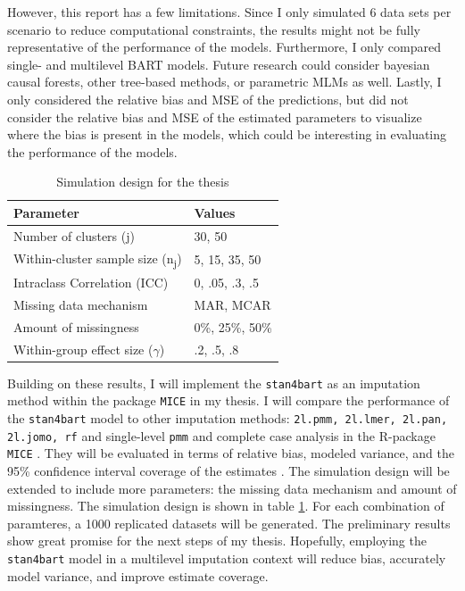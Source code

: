 \documentclass[10pt, a4paper, titlepage]{article}
\begin{document}
However, this report has a few limitations. Since I only simulated 6 data sets per scenario to reduce computational constraints, the results might not be fully representative of the performance of the models. Furthermore, I only compared single- and multilevel BART models. Future research could consider bayesian causal forests, other tree-based methods, or parametric MLMs as well. Lastly, I only considered the relative bias and MSE of the predictions, but did not consider the relative bias and MSE of the estimated parameters to visualize where the bias is present in the models, which could be interesting in evaluating the performance of the models.

\begin{table}
\centering
\caption{Simulation design for the thesis}
\label{tab:simulationparameters2}
\begin{tabular}{l|l}
\textbf{Parameter}                                  & \textbf{Values} \\ \hline
Number of clusters (j)                              & 30, 50          \\
Within-cluster sample size (n\textsubscript{j})     & 5, 15, 35, 50   \\
Intraclass Correlation (ICC)                        & 0, .05, .3, .5  \\
Missing data mechanism                              & MAR, MCAR       \\
Amount of missingness                               & 0\%, 25\%, 50\% \\
Within-group effect size ($\gamma$)                 & .2, .5, .8
\end{tabular}
\end{table}

Building on these results, I will implement the \texttt{stan4bart} as an imputation method within the package \texttt{MICE} \citep{buuren2011} in my thesis. I will compare the performance of the \texttt{stan4bart} model to other imputation methods: \texttt{2l.pmm, 2l.lmer, 2l.pan, 2l.jomo, rf} and single-level \texttt{pmm} and complete case analysis in the R-package \texttt{MICE} \citep{buuren2011}. They will be evaluated in terms of relative bias, modeled variance, and the 95\% confidence interval coverage of the estimates \citep{oberman2023}. The simulation design will be extended to include more parameters: the missing data mechanism and amount of missingness. The simulation design is shown in table \ref{tab:simulationparameters2}. For each combination of paramteres, a 1000 replicated datasets will be generated. The preliminary results show great promise for the next steps of my thesis. Hopefully, employing the \texttt{stan4bart} model in a multilevel imputation context will reduce bias, accurately model variance, and improve estimate coverage.

\newpage


\end{document}
